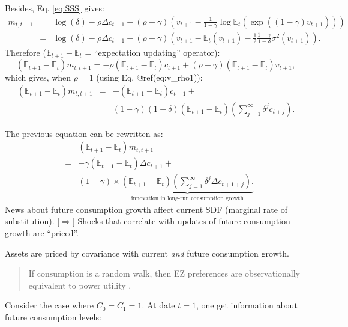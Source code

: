 \documentclass[
  12pt,
]{book}
\theoremstyle{definition}
\theoremstyle{definition}
\theoremstyle{definition}
\theoremstyle{definition}
\theoremstyle{remark}
\begin{document}
Besides, Eq. \eqref{eq:SSS} gives:
\begin{eqnarray*}
m_{t,t+1} &=& \log(\delta) - \rho \Delta c_{t+1} + (\rho - \gamma) \left(v_{t+1} - \frac{1}{1 - \gamma} \log \mathbb{E}_t \left(\exp((1-\gamma)v_{t+1})\right)\right)\\
&=& \log(\delta) - \rho \Delta c_{t+1} + (\rho - \gamma) \left(v_{t+1} - \mathbb{E}_t(v_{t+1}) - \frac{1}{2} \frac{1-\gamma}{1-\delta} \sigma^2(v_{t+1})\right).
\end{eqnarray*}
Therefore (\(\mathbb{E}_{t+1} - \mathbb{E}_t\) = ``expectation updating'' operator):
\[
(\mathbb{E}_{t+1} - \mathbb{E}_t) m_{t,t+1} = - \rho(\mathbb{E}_{t+1} - \mathbb{E}_t) c_{t+1} + (\rho - \gamma) (\mathbb{E}_{t+1} - \mathbb{E}_t) v_{t+1},
\]
which gives, when \(\rho = 1\) (using Eq. @ref(eq:v\_rho1)):
\begin{eqnarray}
(\mathbb{E}_{t+1} - \mathbb{E}_t) m_{t,t+1} &=& - (\mathbb{E}_{t+1} - \mathbb{E}_t) c_{t+1} +  \\
&& (1 - \gamma)(1 - \delta) (\mathbb{E}_{t+1} - \mathbb{E}_t) \left(  \sum_{j=1}^{\infty}  \delta^j c_{t+j}  \right).\nonumber
\end{eqnarray}

The previous equation can be rewritten as:
\begin{eqnarray}
&& (\mathbb{E}_{t+1} - \mathbb{E}_t) m_{t,t+1} \nonumber \\
&=& - \gamma(\mathbb{E}_{t+1} - \mathbb{E}_t)\Delta c_{t+1} +  \label{eq:sdfAbc}\\
&&  (1 - \gamma) \times \underbrace{ (\mathbb{E}_{t+1} - \mathbb{E}_t) \left(  \sum_{j=1}^{\infty}  \delta^j \Delta c_{t+1+j}  \right).}_{\mbox{innovation in long-run consumption growth}}\nonumber
\end{eqnarray}
News about future consumption growth affect current SDF (marginal rate of substitution).
{[}\(\Rightarrow\){]} Shocks that correlate with updates of future consumption growth are ``priced''.

Assets are priced by covariance with current \emph{and} future consumption growth.

\begin{quote}
If consumption is a random walk, then EZ preferences are observationally equivalent to power utility \citep{Kocherlakota_1990}.
\end{quote}

Consider the case where \(C_0 = C_1 = 1\).
At date \(t=1\), one get information about future consumption levels:
\end{document}
